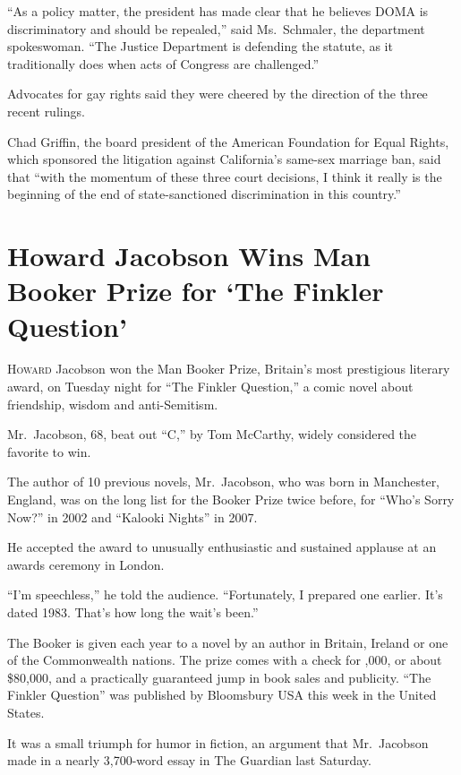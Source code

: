 ﻿\documentclass[12pt]{article}
\begin{document}
``As a policy matter, the president has made clear that he believes DOMA is discriminatory and
should be repealed,'' said Ms.~Schmaler, the department spokeswoman. ``The Justice Department is
defending the statute, as it traditionally does when acts of Congress are challenged.''

Advocates for gay rights said they were cheered by the direction of the three recent rulings.

Chad Griffin, the board president of the American Foundation for Equal Rights, which sponsored the
litigation against California's same-sex marriage ban, said that ``with the momentum of these three
court decisions, I think it really is the beginning of the end of state-sanctioned discrimination in
this country.''

\section{Howard Jacobson Wins Man Booker Prize for `The Finkler Question'}

\lettrine{H}{oward} Jacobson won the Man Booker Prize, Britain's most
prestigious literary award, on Tuesday night for ``The Finkler Question,'' a comic novel about
friendship, wisdom and anti-Semitism.

Mr.~Jacobson, 68, beat out ``C,'' by Tom McCarthy, widely considered the favorite to win.

The author of 10 previous novels, Mr.~Jacobson, who was born in Manchester, England, was on the long
list for the Booker Prize twice before, for ``Who's Sorry Now?'' in 2002 and ``Kalooki Nights'' in
2007.

He accepted the award to unusually enthusiastic and sustained applause at an awards ceremony in
London.

``I'm speechless,'' he told the audience. ``Fortunately, I prepared one earlier. It's dated 1983.
That's how long the wait's been.''

The Booker is given each year to a novel by an author in Britain, Ireland or one of the Commonwealth
nations. The prize comes with a check for ,000, or about \$80,000, and a practically
guaranteed jump in book sales and publicity. ``The Finkler Question'' was published by Bloomsbury
USA this week in the United States.

It was a small triumph for humor in fiction, an argument that Mr.~Jacobson made in a nearly
3,700-word essay in The Guardian last Saturday.
\end{document}
